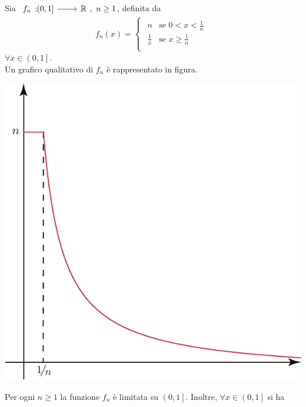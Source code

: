 \begin{example}
	Sia $\funz{f_n}{\left(0,1\right]}{\realset},\ n\geq1$, definita da
	\begin{equation*}
		f_n\left(x\right)=\begin{cases}
			\begin{array}{ll}
				n&\text{se }0<x<\frac{1}{n}\\
				\frac{1}{x}&\text{se }x\geq\frac{1}{n}\\
			\end{array}
		\end{cases}
	\end{equation*}
$\forall x\in \left(0,1\right]$.\\
Un grafico qualitativo di $f_n$ è rappresentato in figura.
\begin{center}
	\includegraphics[trim=0cm 0cm 0cm 0cm, clip, scale=0.65]{images/grafico5.pdf}
\end{center}
Per ogni $n\geq1$ la funzione $f_n$ è limitata su $\left(0,1\right]$. Inoltre, $\forall x\in \left(0,1\right]$ si ha
	

\end{example}
